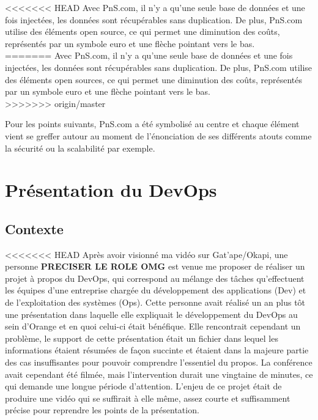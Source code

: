 <<<<<<< HEAD
Avec PnS.com, il n'y a qu'une seule base de données et une fois injectées, les données sont récupérables sans duplication. De plus, PnS.com utilise des éléments open source, ce qui permet une diminution des coûts, représentés par un symbole euro et une flèche pointant vers le bas.\\
=======
Avec PnS.com, il n'y a qu'une seule base de données et une fois injectées, les données sont récupérables sans duplication. De plus, PnS.com utilise des éléments open sources, ce qui permet une diminution des coûts, représentés par un symbole euro et une flèche pointant vers le bas.\\
>>>>>>> origin/master

Pour les points suivants, PnS.com a été symbolisé au centre et chaque élément vient se greffer autour au moment de l'énonciation de ses différents atouts comme la sécurité ou la scalabilité par exemple.


\section{Présentation du DevOps}


\subsection{Contexte}

<<<<<<< HEAD
Après avoir visionné ma vidéo sur Gat'ape/Okapi, une personne \textbf{PRECISER LE ROLE OMG} est venue me proposer de réaliser un projet à propos du DevOps, qui correspond au mélange des tâches qu'effectuent les équipes d'une entreprise chargée du développement des applications (Dev) et de l'exploitation des systèmes (Ops). Cette personne avait réalisé un an plus tôt une présentation dans laquelle elle expliquait le développement du DevOps au sein d'Orange et en quoi celui-ci était bénéfique. Elle rencontrait cependant un problème, le support de cette présentation était un fichier dans lequel les informations étaient résumées de façon succinte et étaient dans la majeure partie des cas insuffisantes pour pouvoir comprendre l'essentiel du propos. La conférence avait cependant été filmée, mais l'intervention durait une vingtaine de minutes, ce qui demande une longue période d'attention. L'enjeu de ce projet était de produire une vidéo qui se suffirait à elle même, assez courte et suffisamment précise pour reprendre les points de la présentation.



